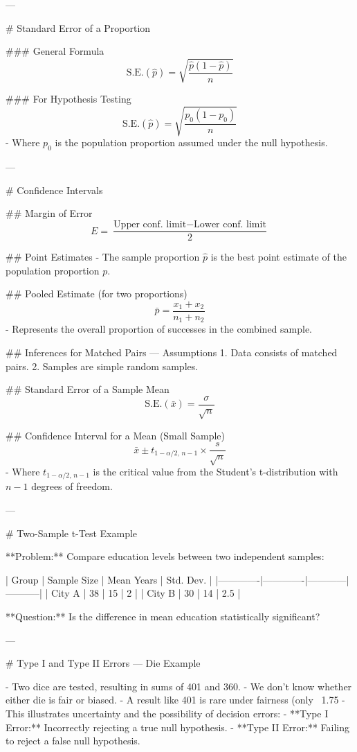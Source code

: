 ---

# Standard Error of a Proportion

### General Formula
\[
\mbox{S.E.}(\hat{p}) = \sqrt{\frac{\hat{p}(1 - \hat{p})}{n}}
\]

### For Hypothesis Testing
\[
\mbox{S.E.}(\hat{p}) = \sqrt{\frac{p_0(1 - p_0)}{n}}
\]
- Where \( p_0 \) is the population proportion assumed under the null hypothesis.

---

# Confidence Intervals

## Margin of Error
\[
E = \frac{\text{Upper conf. limit} - \text{Lower conf. limit}}{2}
\]

## Point Estimates
- The sample proportion \( \hat{p} \) is the best point estimate of the population proportion \( p \).

## Pooled Estimate (for two proportions)
\[
\bar{p} = \frac{x_1 + x_2}{n_1 + n_2}
\]
- Represents the overall proportion of successes in the combined sample.

## Inferences for Matched Pairs — Assumptions
1. Data consists of matched pairs.  
2. Samples are simple random samples.

## Standard Error of a Sample Mean
\[
\mbox{S.E.}(\bar{x}) = \frac{\sigma}{\sqrt{n}}
\]

## Confidence Interval for a Mean (Small Sample)
\[
\bar{x} \pm t_{1-\alpha/2,\,n-1} \times \frac{s}{\sqrt{n}}
\]
- Where \( t_{1-\alpha/2,\,n-1} \) is the critical value from the Student’s t-distribution with \( n - 1 \) degrees of freedom.

---

# Two-Sample t-Test Example

**Problem:**  
Compare education levels between two independent samples:

| Group       | Sample Size | Mean Years | Std. Dev. |
|-------------|-------------|------------|-----------|
| City A      | 38          | 15         | 2         |
| City B      | 30          | 14         | 2.5       |

**Question:** Is the difference in mean education statistically significant?

---

# Type I and Type II Errors — Die Example

- Two dice are tested, resulting in sums of 401 and 360.
- We don't know whether either die is fair or biased.
- A result like 401 is rare under fairness (only ~1.75%
- This illustrates uncertainty and the possibility of decision errors:
  - **Type I Error:** Incorrectly rejecting a true null hypothesis.
  - **Type II Error:** Failing to reject a false null hypothesis.

